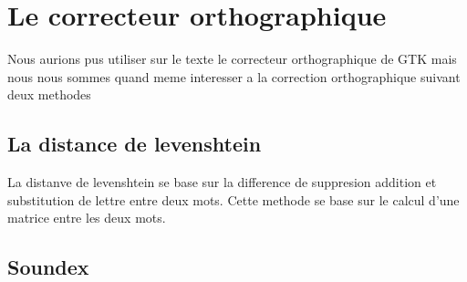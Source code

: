 \section{Le correcteur orthographique}
Nous aurions pus utiliser sur le texte le correcteur orthographique de GTK mais nous nous sommes quand meme interesser a la correction orthographique suivant deux methodes 
\subsection{La distance de levenshtein}
La distanve de levenshtein se base sur la difference de suppresion addition et substitution de lettre entre deux mots. Cette methode se base sur le calcul d'une matrice entre les deux mots.
\subsection{Soundex}

